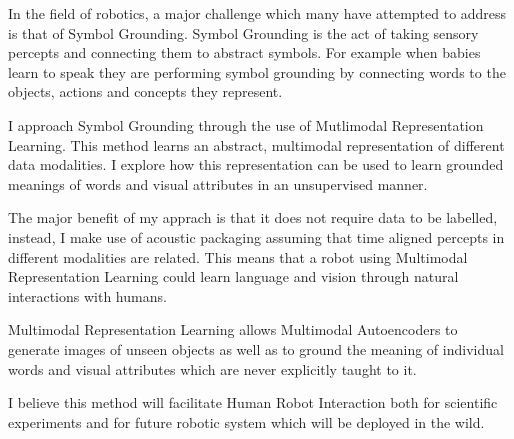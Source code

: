 In the field of robotics, a major challenge which many have attempted to address is that of Symbol Grounding. Symbol Grounding is the act of taking sensory percepts and connecting them to abstract symbols. For example when babies learn to speak they are performing symbol grounding by connecting words to the objects, actions and concepts they represent.

I approach Symbol Grounding through the use of Mutlimodal Representation Learning. This method learns an abstract, multimodal representation of different data modalities. I explore how this representation can be used to learn grounded meanings of words and visual attributes in an unsupervised manner.

The major benefit of my apprach is that it does not require data to be labelled, instead, I make use of acoustic packaging assuming that time aligned percepts in different modalities are related. This means that a robot using Multimodal Representation Learning could learn language and vision through natural interactions with humans.


Multimodal Representation Learning allows Multimodal Autoencoders to generate images of unseen objects as well as to ground the meaning of individual words and visual attributes which are never explicitly taught to it. 

I believe this method will facilitate Human Robot Interaction both for scientific experiments and for future robotic system which will be deployed in the wild.

